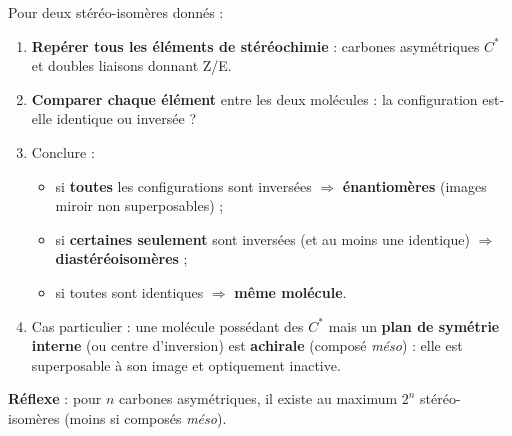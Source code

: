 \documentclass[11pt]{article}
\begin{document}
\begin{methode}
Pour deux stéréo-isomères donnés :
\begin{enumerate}
\item \textbf{Repérer tous les éléments de stéréochimie} : carbones asymétriques $C^*$ et doubles liaisons  donnant Z/E.
\item \textbf{Comparer chaque élément} entre les deux molécules : la configuration est-elle identique ou inversée ?
\item Conclure :
\begin{itemize}
\item si \textbf{toutes} les configurations sont inversées $\Rightarrow$ \textbf{énantiomères} (images miroir non superposables) ;
\item si \textbf{certaines seulement} sont inversées (et au moins une identique) $\Rightarrow$ \textbf{diastéréoisomères} ;
\item si toutes sont identiques $\Rightarrow$ \textbf{même molécule}.
\end{itemize}
\item Cas particulier : une molécule possédant des $C^*$ mais un \textbf{plan de symétrie interne} (ou centre d'inversion) est \textbf{achirale} (composé \emph{méso}) : elle est superposable à son image et optiquement inactive.
\end{enumerate}
\textbf{Réflexe} : pour $n$ carbones asymétriques, il existe au maximum $2^n$ stéréo-isomères (moins si composés \emph{méso}).
\end{methode}
\end{document}
